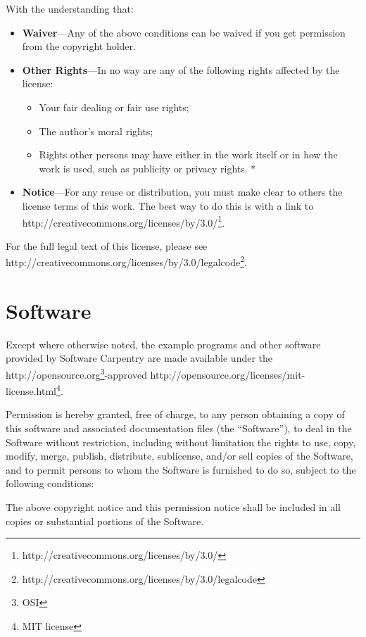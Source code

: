 \documentclass[]{book}
\newcommand{\urlfoot}[2]{{#1}\footnote{#2}}
\begin{document}
With the understanding that:

\begin{itemize}
\item
  \textbf{Waiver}---Any of the above conditions can be waived if you get
  permission from the copyright holder.
\item
  \textbf{Other Rights}---In no way are any of the following rights
  affected by the license:

  \begin{itemize}
  \item
    Your fair dealing or fair use rights;
  \item
    The author's moral rights;
  \item
    Rights other persons may have either in the work itself or in how
    the work is used, such as publicity or privacy rights. *
  \end{itemize}
\item
  \textbf{Notice}---For any reuse or distribution, you must make clear
  to others the license terms of this work. The best way to do this is
  with a link to
  \urlfoot{http://creativecommons.org/licenses/by/3.0/}{http://creativecommons.org/licenses/by/3.0/}.
\end{itemize}

For the full legal text of this license, please see
\urlfoot{http://creativecommons.org/licenses/by/3.0/legalcode}{http://creativecommons.org/licenses/by/3.0/legalcode}.

\section{Software}

Except where otherwise noted, the example programs and other software
provided by Software Carpentry are made available under the
\urlfoot{http://opensource.org}{OSI}-approved
\urlfoot{http://opensource.org/licenses/mit-license.html}{MIT license}.

Permission is hereby granted, free of charge, to any person obtaining a
copy of this software and associated documentation files (the
``Software''), to deal in the Software without restriction, including
without limitation the rights to use, copy, modify, merge, publish,
distribute, sublicense, and/or sell copies of the Software, and to
permit persons to whom the Software is furnished to do so, subject to
the following conditions:

The above copyright notice and this permission notice shall be included
in all copies or substantial portions of the Software.
\end{document}
